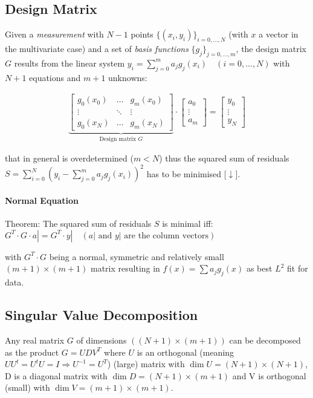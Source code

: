 \subsection{Design Matrix}
Given a \emph{measurement} with $N-1$ points $\{(x_i,y_i)\}_{i=0,\ldots,N}$ (with $x$ a vector in the multivariate case)
and a set of \emph{basis functions} $\{g_j\}_{j=0,\ldots,m}$,
the design matrix $G$ results from the linear system
$y_i=\sum_{j=0}^ma_jg_j(x_i)\quad(i=0,\ldots,N)$ with $N+1$ equations and $m+1$ unknowns:

\begin{snugshade*}
  \begin{align*}
    \underbrace{
      \begin{bmatrix}
        g_0(x_0) & \hdots & g_m(x_0) \\
        \vdots & \ddots & \vdots \\
        g_0(x_N) & \hdots & g_m(x_N)
      \end{bmatrix}
    }_{\text{Design matrix }G}
    \cdot
    \begin{bmatrix}
      a_0 \\
      \vdots \\
      a_m
    \end{bmatrix}
    =
    \begin{bmatrix}
      y_0 \\
      \vdots \\
      y_N
    \end{bmatrix}
  \end{align*}
\end{snugshade*}
that in general is overdetermined ($m<N$) thus the squared sum of residuals
$S=\sum_{i=0}^{N}\left(y_{i}-\sum_{j=0}^{m}a_{j}g_{j}(x_{i})\right)^{2}$
has to be minimised [$\downarrow$].

\paragraph{Normal Equation} Theorem: The squared sum of residuals $S$ is minimal iff:
\colorbox{shadecolor}{$
	G^T\cdot G\cdot a| = G^T\cdot y|\quad (a|\text{ and }y|\text{ are the column vectors})
$}

with $G^T\cdot G$ being a normal,
symmetric and relatively small $(m+1)\times(m+1)$ matrix resulting in $f(x)=\sum a_jg_j(x)$ as best $L^2$ fit for data.

\subsection{Singular Value Decomposition}
Any real matrix $G$ of dimensions $((N+1)\times (m+1))$ can be decomposed as the product $G=UDV^T$ 
where $U$ is an orthogonal (meaning $UU^t=U^tU=I\Rightarrow U^{-1}=U^T$) (large) matrix with $\dim U = (N+1)\times (N+1)$, 
D is a diagonal matrix with $\dim D = (N+1)\times (m+1)$ and
V is orthogonal (small) with $\dim V = (m+1)\times (m+1)$.

